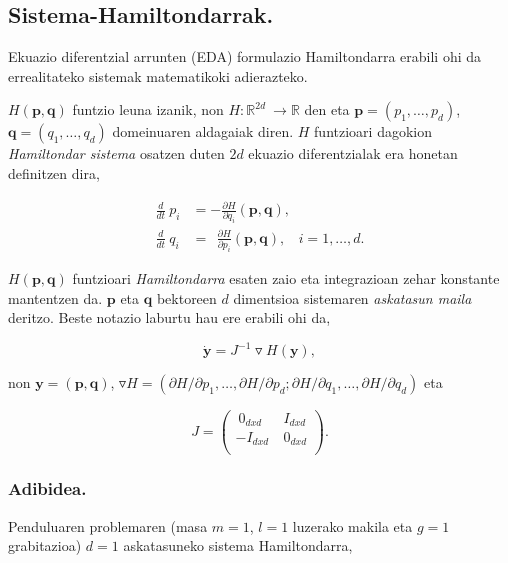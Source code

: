 \subsection{Sistema-Hamiltondarrak.}


Ekuazio diferentzial arrunten (EDA) formulazio Hamiltondarra erabili ohi da errealitateko sistemak matematikoki adierazteko. 

$H(\mathbf{p},\mathbf{q})$ funtzio leuna izanik, non  $H: {\mathbb{R}}^{2d} \ \longrightarrow {\mathbb{R}}$  den eta  $\mathbf{p}=(p_1, \dots , p_d)$, $\mathbf{q}=(q_1, \dots , q_d)$ domeinuaren aldagaiak diren. $H$ funtzioari dagokion \emph{Hamiltondar sistema} osatzen duten $2d$ ekuazio diferentzialak era honetan definitzen dira,

\begin{align*}
\frac{d}{dt} \ {p}_i & =-\frac{\partial H }{\partial q_i} (\mathbf{p},\mathbf{q}), \\
\frac{d}{dt} \ {q}_i & =\ \ \frac{\partial H}{\partial p_i} (\mathbf{p},\mathbf{q}), \ \ \ \ i=1,\dots,d.
\end{align*}

$H(\mathbf{p},\mathbf{q})$ funtzioari \emph{Hamiltondarra} esaten zaio eta integrazioan zehar konstante mantentzen da. $\mathbf{p}$ eta $\mathbf{q}$ bektoreen $d$ dimentsioa sistemaren \emph{askatasun maila} deritzo. Beste notazio laburtu hau ere erabili ohi da,

\begin{equation*}
\dot{\mathbf{y}}=J^{-1}\triangledown H(\mathbf{y}),
\end{equation*}

non $\mathbf{y}=(\mathbf{p},\mathbf{q})$, $\triangledown H=(\partial H/\partial p_1,\dots,\partial H/\partial p_d; \partial H/\partial q_1,\dots,\partial H/\partial q_d)$ eta

\begin{equation*}
 J=\left(\begin{array}{cc}
   \ 0_{dxd} & \ I_{dxd} \\
    -I_{dxd} & \ 0_{dxd} \\
\end{array}\right).  
\end{equation*}

\subsubsection*{Adibidea.} Penduluaren problemaren (masa $m=1$, $l=1$ luzerako makila eta $g=1$ grabitazioa) $d=1$ askatasuneko sistema Hamiltondarra,

